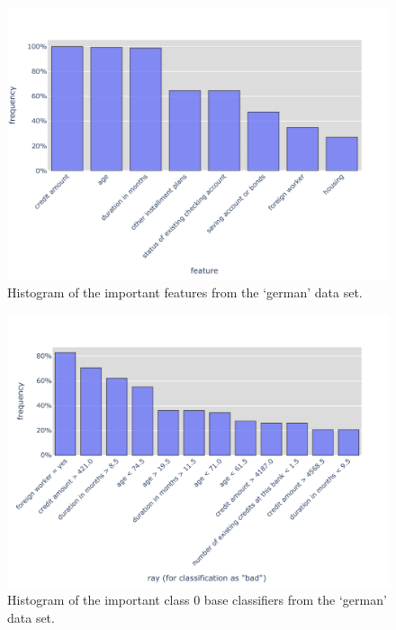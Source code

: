\begin{figure}[H]
    \centering
    \includegraphics[width=0.9\columnwidth]{figures/german/featureHistogram.pdf}
    \caption{Histogram of the important features from the `german' data set.}\label{fig:histGermanF}
\end{figure}
\begin{figure}[H]
    \centering
    \includegraphics[width=0.9\columnwidth]{figures/german/raysClass0Histogram.pdf}
    \caption{Histogram of the important class 0 base classifiers from the `german' data set.}\label{fig:histGermanR0}
\end{figure}
